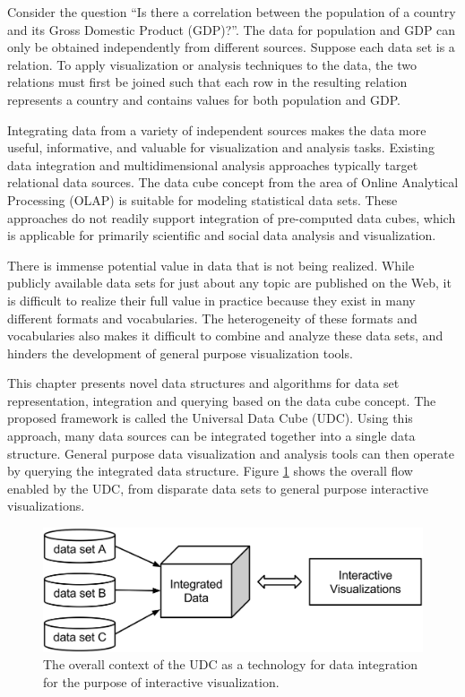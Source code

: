 Consider the question ``Is there a correlation between the population of a country and its Gross Domestic Product (GDP)?''. The data for population and GDP can only be obtained independently from different sources. Suppose each data set is a relation. To apply visualization or analysis techniques to the data, the two relations must first be joined such that each row in the resulting relation represents a country and contains values for both population and GDP.

Integrating data from a variety of independent sources makes the data more useful, informative, and valuable for visualization and analysis tasks. Existing data integration and multidimensional analysis approaches typically target relational data sources. The data cube concept from the area of Online Analytical Processing (OLAP) is suitable for modeling statistical data sets. These approaches do not readily support integration of pre-computed data cubes, which is applicable for primarily scientific and social data analysis and visualization.

There is immense potential value in data that is not being realized. While publicly available data sets for just about any topic are published on the Web, it is difficult to realize their full value in practice because they exist in many different formats and vocabularies. The heterogeneity of these formats and vocabularies also makes it difficult to combine and analyze these data sets, and hinders the development of general purpose visualization tools.

This chapter presents novel data structures and algorithms for data set representation, integration and querying based on the data cube concept. The proposed framework is called the Universal Data Cube (UDC). Using this approach, many data sources can be integrated together into a single data structure. General purpose data visualization and analysis tools can then operate by querying the integrated data structure. Figure \ref{fig:flow} shows the overall flow enabled by the UDC, from disparate data sets to general purpose interactive visualizations.

\begin{figure}
  \centering
  \includegraphics[width=\figureWidth]{figs/flow.png}
  \caption [Universal Data Cube Overview]{The overall context of the UDC as a technology for data integration for the purpose of interactive visualization. }
  \label{fig:flow}
\end{figure}

